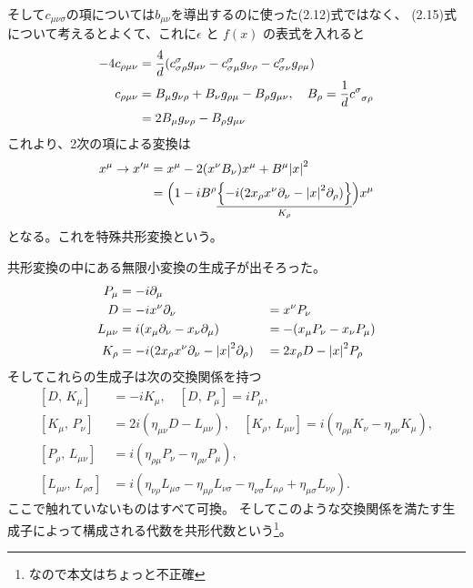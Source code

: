 \documentclass[../../master.tex]{subfiles}
\begin{document}
そして\(c_{\mu\nu\sigma}\)の項については\(b_{\mu\nu}\)を導出するのに使った(2.12)式ではなく、
(2.15)式について考えるとよくて、これに\(\epsilon\) と \(f(x)\) の表式を入れると
\begin{align}
    -4c_{\rho\mu\nu}
    &= \frac{4}{d}(c_{\sigma\rho}^\sigma g_{\mu\nu}-c_{\sigma\mu}^\sigma g_{\nu\rho}-c_{\sigma\nu}^\sigma g_{\rho\mu}) \notag\\
    c_{\rho\mu\nu} &= B_\mu g_{\nu\rho} + B_\nu g_{\rho\mu} - B_\rho g_{\mu\nu},\quad B_\rho = \frac{1}{d}c\indices{^\sigma_{\sigma\rho}}\\
    &= 2 B_\mu g_{\nu\rho} - B_\rho g_{\mu\nu}\notag
\end{align}
これより、2次の項による変換は
\begin{align}
    x^\mu\rightarrow x'^\mu
    &= x^\mu - 2(x^\nu B_\nu)x^\mu + B^\mu \abs{x}^2\\
    &= \Bigl(1 -iB^\rho\underset{K_\rho}{\underline{\Bigl\{-i(2x_\rho x^\nu\partial_\nu - \abs{x}^2\partial_\rho)\Bigr\}}}\Bigr)x^\mu \notag
\end{align}
となる。これを特殊共形変換という。

共形変換の中にある無限小変換の生成子が出そろった。
\begin{alignat}{4}
    P_\mu &= -i\partial_\mu& &\notag\\
    D &= -ix^\nu\partial_\nu &&= x^\nu P_\nu\\
    L_{\mu\nu} &= i(x_\mu\partial_\nu-x_\nu\partial_\mu)&&=-(x_\mu P_\nu-x_\nu P_\mu)\notag\\
    K_\rho &= -i(2x_\rho x^\nu\partial_\nu - \abs{x}^2\partial_\rho)
    &&=2x_\rho D - \abs{x}^2 P_\rho
\end{alignat}
そしてこれらの生成子は次の交換関係を持つ
\begin{equation}
    \begin{split}
        [D,\,K_\mu] &= -iK_\mu, \quad
        [D,\,P_\mu] = iP_\mu, \\
        [K_\mu,\,P_\nu] &= 2i(\eta_{\mu\nu}D-L_{\mu\nu}), \quad
        [K_\rho,\,L_{\mu\nu}] = i(\eta_{\rho\mu} K_\nu -\eta_{\rho\nu}K_{\mu}),\\
        [P_\rho,\,L_{\mu\nu}] &= i(\eta_{\rho\mu}P_\nu-\eta_{\rho\nu}P_\mu),\\
        [L_{\mu\nu},\,L_{\rho\sigma}] &= i(\eta_{\nu\rho}L_{\mu\sigma}-\eta_{\mu\rho}L_{\nu\sigma}-\eta_{\nu\sigma}L_{\mu\rho}+\eta_{\mu\sigma}L_{\nu\rho}).
    \end{split}
\end{equation}
ここで触れていないものはすべて可換。
そしてこのような交換関係を満たす生成子によって構成される代数を共形代数という\footnote{なので本文はちょっと不正確}。
\end{document}
